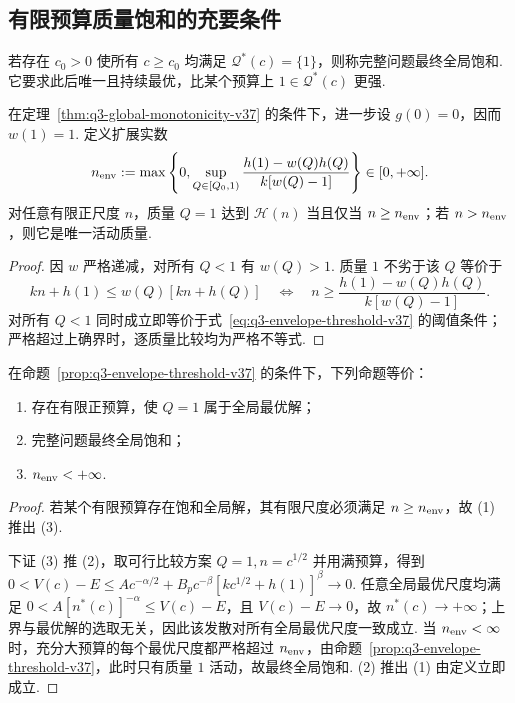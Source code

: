 \subsection{有限预算质量饱和的充要条件}

\begin{definition}[最终全局饱和]\label{def:q3-eventual-saturation-v29}
若存在 $c_0>0$ 使所有 $c\ge c_0$ 均满足 $\mathcal Q^*(c)=\{1\}$，则称完整问题最终全局饱和. 它要求此后唯一且持续最优，比某个预算上 $1\in\mathcal Q^*(c)$ 更强. 
\end{definition}

\begin{proposition}[固定尺度的质量饱和阈值]\label{prop:q3-envelope-threshold-v37}
在定理~\ref{thm:q3-global-monotonicity-v37} 的条件下，进一步设 $g(0)=0$，因而 $w(1)=1$. 定义扩展实数
\begin{equation}\label{eq:q3-envelope-threshold-v37}
n_{\rm env}:=\max\left\{0,\sup_{Q\in[Q_0,1)}
\frac{h(1)-w(Q)h(Q)}{k[w(Q)-1]}\right\}\in[0,+\infty].
\end{equation}
对任意有限正尺度 $n$，质量 $Q=1$ 达到 $\mathscr H(n)$ 当且仅当 $n\ge n_{\rm env}$；若 $n>n_{\rm env}$，则它是唯一活动质量. 
\end{proposition}
\begin{proof}
因 $w$ 严格递减，对所有 $Q<1$ 有 $w(Q)>1$. 质量 $1$ 不劣于该 $Q$ 等价于
\[
kn+h(1)\le w(Q)[kn+h(Q)]
\quad\Longleftrightarrow\quad
n\ge\frac{h(1)-w(Q)h(Q)}{k[w(Q)-1]}.
\]
对所有 $Q<1$ 同时成立即等价于式~\eqref{eq:q3-envelope-threshold-v37} 的阈值条件；严格超过上确界时，逐质量比较均为严格不等式. 
\end{proof}

\begin{theorem}[有限预算质量饱和的充要条件]\label{thm:q3-finite-saturation-iff-v37}
在命题~\ref{prop:q3-envelope-threshold-v37} 的条件下，下列命题等价：
    \begin{enumerate}
        \item 存在有限正预算，使 $Q=1$ 属于全局最优解；
        \item 完整问题最终全局饱和；
        \item $n_{\rm env}<+\infty$.
    \end{enumerate}
\end{theorem}
\begin{proof}
若某个有限预算存在饱和全局解，其有限尺度必须满足 $n\ge n_{\rm env}$，故 (1) 推出 (3). 

下证 (3) 推 (2)，取可行比较方案 $Q=1,n=c^{1/2}$ 并用满预算，得到
$0<V(c)-E\le Ac^{-\alpha/2}+B_pc^{-\beta}[kc^{1/2}+h(1)]^\beta\longrightarrow0.$
任意全局最优尺度均满足 $0<A[n^*(c)]^{-\alpha}\le V(c)-E$，且 $V(c)-E\to0$，故 $n^*(c)\to+\infty$；上界与最优解的选取无关，因此该发散对所有全局最优尺度一致成立. 当 $n_{\rm env}<\infty$ 时，充分大预算的每个最优尺度都严格超过 $n_{\rm env}$，由命题~\ref{prop:q3-envelope-threshold-v37}，此时只有质量 $1$ 活动，故最终全局饱和. (2) 推出 (1) 由定义立即成立. 
\end{proof}

